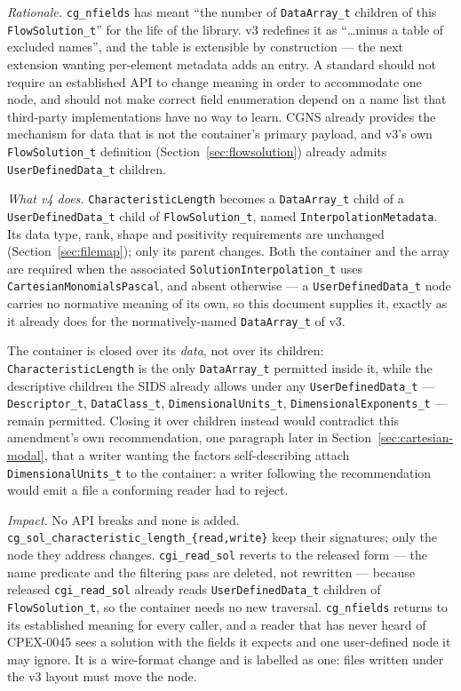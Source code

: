 \documentclass[11pt,letterpaper]{article}
\newif\ifvfourdraft
\newenvironment{v4block}{\ifvfourdraft\color{v4violet}\fi\ignorespaces}{\par}
\begin{document}
{\begin{v4block}
\begin{enumerate}[leftmargin=1.4em,itemsep=0.5em]
    \textit{Rationale.}  \texttt{cg\_nfields} has meant ``the number of
    \texttt{DataArray\_t} children of this \texttt{FlowSolution\_t}'' for the
    life of the library.  v3 redefines it as ``\ldots minus a table of excluded
    names'', and the table is extensible by construction --- the next extension
    wanting per-element metadata adds an entry.  A standard should not require
    an established API to change meaning in order to accommodate one node, and
    should not make correct field enumeration depend on a name list that
    third-party implementations have no way to learn.  CGNS already provides the
    mechanism for data that is not the container's primary payload, and v3's own
    \texttt{FlowSolution\_t} definition (Section~\ref{sec:flowsolution}) already
    admits \texttt{UserDefinedData\_t} children.

    \textit{What v4 does.}  \texttt{CharacteristicLength} becomes a
    \texttt{DataArray\_t} child of a \texttt{UserDefinedData\_t} child of
    \texttt{FlowSolution\_t}, named \texttt{InterpolationMetadata}.  Its data
    type, rank, shape and positivity requirements are unchanged
    (Section~\ref{sec:filemap}); only its parent changes.  Both the container
    and the array are required when the associated
    \texttt{SolutionInterpolation\_t} uses \texttt{CartesianMonomialsPascal},
    and absent otherwise --- a \texttt{UserDefinedData\_t} node carries no
    normative meaning of its own, so this document supplies it, exactly as it
    already does for the normatively-named \texttt{DataArray\_t} of v3.

    The container is closed over its \emph{data}, not over its children:
    \texttt{CharacteristicLength} is the only \texttt{DataArray\_t} permitted
    inside it, while the descriptive children the SIDS already allows under any
    \texttt{UserDefinedData\_t} --- \texttt{Descriptor\_t}, \texttt{DataClass\_t},
    \texttt{DimensionalUnits\_t}, \texttt{DimensionalExponents\_t} --- remain
    permitted.  Closing it over children instead would contradict this
    amendment's own recommendation, one paragraph later in
    Section~\ref{sec:cartesian-modal}, that a writer wanting the factors
    self-describing attach \texttt{DimensionalUnits\_t} to the container: a
    writer following the recommendation would emit a file a conforming reader
    had to reject.

    \textit{Impact.}  No API breaks and none is added.
    \texttt{cg\_sol\_characteristic\_length\_\{read,write\}} keep their
    signatures; only the node they address changes.  \texttt{cgi\_read\_sol}
    reverts to the released form --- the name predicate and the filtering pass
    are deleted, not rewritten --- because released \texttt{cgi\_read\_sol}
    already reads \texttt{UserDefinedData\_t} children of
    \texttt{FlowSolution\_t}, so the container needs no new traversal.
    \texttt{cg\_nfields} returns to its established meaning for every caller,
    and a reader that has never heard of CPEX-0045 sees a solution with the
    fields it expects and one user-defined node it may ignore.  It is a
    wire-format change and is labelled as one: files written under the v3 layout
    must move the node.


\end{enumerate}
\end{v4block}}
\end{document}
